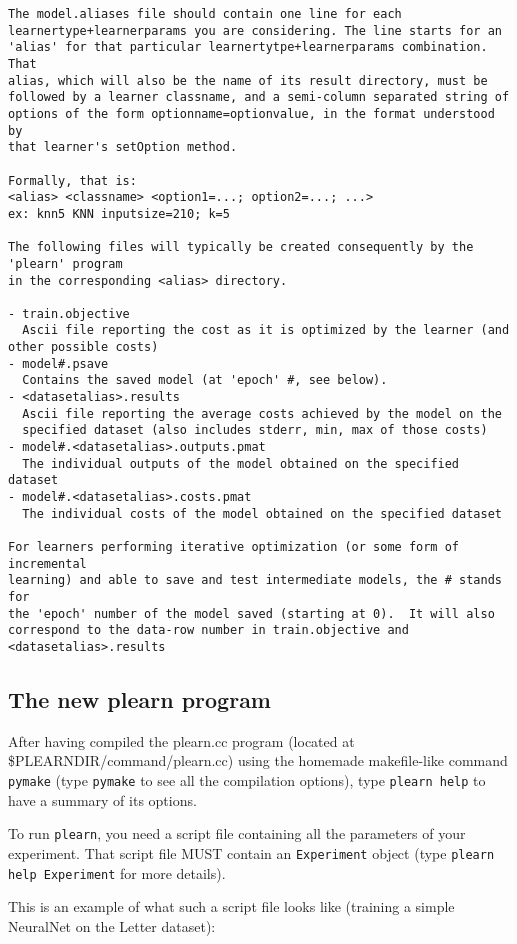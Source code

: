 \documentclass[11pt]{book}
\begin{document}
\begin{verbatim}
The model.aliases file should contain one line for each
learnertype+learnerparams you are considering. The line starts for an
'alias' for that particular learnertytpe+learnerparams combination. That
alias, which will also be the name of its result directory, must be
followed by a learner classname, and a semi-column separated string of
options of the form optionname=optionvalue, in the format understood by
that learner's setOption method.

Formally, that is: 
<alias> <classname> <option1=...; option2=...; ...>
ex: knn5 KNN inputsize=210; k=5 

The following files will typically be created consequently by the 'plearn' program
in the corresponding <alias> directory.

- train.objective   
  Ascii file reporting the cost as it is optimized by the learner (and other possible costs)
- model#.psave        
  Contains the saved model (at 'epoch' #, see below).
- <datasetalias>.results 
  Ascii file reporting the average costs achieved by the model on the 
  specified dataset (also includes stderr, min, max of those costs)
- model#.<datasetalias>.outputs.pmat 
  The individual outputs of the model obtained on the specified dataset
- model#.<datasetalias>.costs.pmat
  The individual costs of the model obtained on the specified dataset

For learners performing iterative optimization (or some form of incremental
learning) and able to save and test intermediate models, the # stands for
the 'epoch' number of the model saved (starting at 0).  It will also
correspond to the data-row number in train.objective and
<datasetalias>.results
\end{verbatim}

\subsection{The new plearn program}

After having compiled the plearn.cc program (located at \$PLEARNDIR/command/plearn.cc)
using the homemade makefile-like command \verb!pymake! (type \verb!pymake! to see all
the compilation options), type \verb!plearn help! to have a summary of its options.

To run \verb!plearn!, you need a script file containing all the parameters of your
experiment.  That script file MUST contain an \verb!Experiment! object (type
\verb!plearn help Experiment! for more details).

This is an example of what such a script file looks like (training a simple NeuralNet
on the Letter dataset):
\end{document}
